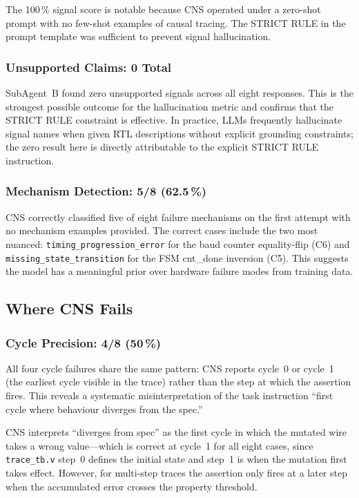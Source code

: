 \documentclass[11pt,a4paper]{article}
\begin{document}
The 100\,\% signal score is notable because CNS operated under a zero-shot
prompt with no few-shot examples of causal tracing. The STRICT RULE in the
prompt template was sufficient to prevent signal hallucination.

\subsubsection{Unsupported Claims: 0 Total}

SubAgent~B found zero unsupported signals across all eight responses. This is
the strongest possible outcome for the hallucination metric and confirms that the
STRICT RULE constraint is effective. In practice, LLMs frequently hallucinate
signal names when given RTL descriptions without explicit grounding constraints;
the zero result here is directly attributable to the explicit STRICT RULE
instruction.

\subsubsection{Mechanism Detection: 5/8 (62.5\,\%)}

CNS correctly classified five of eight failure mechanisms on the first attempt
with no mechanism examples provided. The correct cases include the two most
nuanced: \texttt{timing\_progression\_error} for the baud counter
equality-flip (C6) and \texttt{missing\_state\_transition} for the FSM
cnt\_done inversion (C5). This suggests the model has a meaningful prior over
hardware failure modes from training data.

\subsection{Where CNS Fails}

\subsubsection{Cycle Precision: 4/8 (50\,\%)}
\label{sec:analysis_cycle}

All four cycle failures share the same pattern: CNS reports cycle~0 or cycle~1
(the earliest cycle visible in the trace) rather than the step at which the
assertion fires. This reveals a systematic misinterpretation of the task
instruction ``first cycle where behaviour diverges from the spec.''

CNS interprets ``diverges from spec'' as the first cycle in which the mutated
wire takes a wrong value---which is correct at cycle~1 for all eight cases,
since \texttt{trace\_tb.v} step~0 defines the initial state and step~1 is when
the mutation first takes effect. However, for multi-step traces the assertion
only fires at a later step when the accumulated error crosses the property
threshold.
\end{document}
